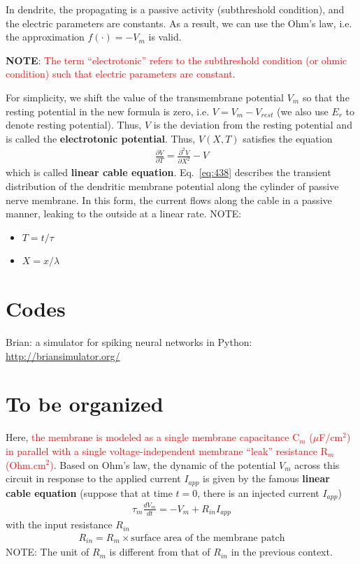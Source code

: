 In dendrite, the propagating is a passive activity (subthreshold
condition), and the electric parameters are constants. As a result, we
can use the Ohm's law, i.e. the approximation $f(\cdot)=-V_m$ is valid.

{\bf NOTE}:
\textcolor{red}{The term ``electrotonic'' refers to the subthreshold
  condition (or ohmic condition) such that electric parameters are
  constant}.

For simplicity, we shift the value of the transmembrane potential
$V_m$ so that the resting potential in the new formula is zero,
i.e. $V=V_m-V_{rest}$ (we also use $E_r$ to denote resting
potential). Thus, $V$ is the deviation from the resting potential and
is called the {\bf electrotonic potential}. Thus, $V(X,T)$ satisfies
the equation
\begin{eqnarray}
  \label{eq:438}
    \frac{\partial V}{\partial T}  =
   \frac{\partial^2V}{\partial X^2} - V
\end{eqnarray}
which is called {\bf linear cable equation}. Eq.~\eqref{eq:438}
describes the transient distribution of the dendritic membrane
potential along the cylinder of passive nerve membrane. In this form,
the current flows along the cable in a passive manner, leaking to the
outside at a linear rate. NOTE:
\begin{itemize}
\item $T=t/\tau$
\item $X=x/\lambda$
\end{itemize}



\section{Codes}


Brian: a simulator for spiking neural networks in Python:
\url{http://briansimulator.org/}

\section{To be organized}

Here,
\textcolor{red}{the membrane is modeled as a single membrane
  capacitance C$_m$ ($\mu$F/cm$^2$) in parallel with a single
  voltage-independent membrane ``leak'' resistance R$_m$
  (Ohm.cm$^2$)}.
Based on Ohm's law, the dynamic of the potential $V_m$ across this
circuit in response to the applied current $I_{app}$ is given by the
famous {\bf linear cable equation} (suppose that at time $t=0$, there
is an injected current $I_{app}$)
\begin{eqnarray}
  \label{eq:491}
  \tau_m\frac{dV_m}{dt} = -V_m + R_{in}I_{app}
\end{eqnarray}
with the input resistance $R_{in}$
\begin{eqnarray*}
  R_{in}=R_m\times
  \text{surface area of the membrane patch}
\end{eqnarray*}
NOTE: The unit of $R_m$ is different from that of $R_{in}$ in the
previous context.

